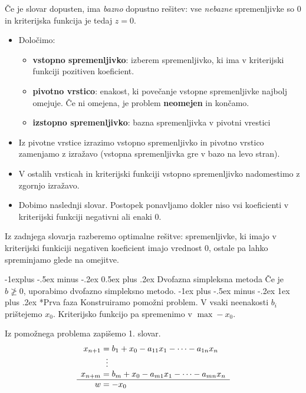 \documentclass[a4paper,8pt]{extarticle}
\makeatletter
\renewcommand{\subsection}{\@startsection{subsection}{2}{0mm}%
                                {-1explus -.5ex minus -.2ex}%
                                {0.5ex plus .2ex}%
                                {\normalfont\normalsize\bfseries}}
\renewcommand{\subsubsection}{\@startsection{subsubsection}{3}{0mm}%
                                {-1ex plus -.5ex minus -.2ex}%
                                {1ex plus .2ex}%
                                {\normalfont\small\bfseries}}
\makeatother
\begin{document}
\begin{multicols}{4}
Če je slovar dopusten, ima \emph{bazno} dopustno rešitev: vse \emph{nebazne} spremenljivke so 0 in kriterijska funkcija je tedaj $z = 0$.
\begin{itemize}
	\item Določimo:
	\begin{itemize}
		\item \textbf{vstopno spremenljivko}: izberem spremenljivko, ki ima v kriterijski funkciji pozitiven koeficient. \\
		\item \textbf{pivotno vrstico}: enakost, ki povečanje vstopne spremenljivke najbolj omejuje. Če ni omejena, je problem \textbf{neomejen} in končamo.\\
		\item \textbf{izstopno spremenljivko}: bazna spremenljivka v pivotni vrestici
	\end{itemize}
	\item Iz pivotne vrstice izrazimo vstopno spremenljivko in pivotno vrstico zamenjamo z izražavo (vstopna spremenljivka gre v bazo na levo stran).
	\item V ostalih vrsticah in kriterijski funkciji vstopno spremenljivko nadomestimo z zgornjo izražavo.
	\item Dobimo naslednji slovar. Postopek ponavljamo dokler niso vsi koeficienti v kriterijski funkciji negativni ali enaki 0.
\end{itemize}

Iz zadnjega slovarja razberemo optimalne rešitve: spremenljivke, ki imajo v kriterijski funkiciji negativen koeficient imajo vrednost 0, ostale pa lahko spreminjamo glede na omejitve.

\subsection{Dvofazna simpleksna metoda}
Če je $b \ngeq 0$, uporabimo dvofazno simpleksno metodo.
\subsubsection*{Prva faza}
Konstruiramo pomožni problem. V vsaki neenakosti $b_i$ prištejemo $x_0$. Kriterijsko funkcijo pa spremenimo v $\max -x_0$.

Iz pomožnega problema zapišemo 1. slovar.
\begin{align*}
	\begin{array}{r@{\;} l}
		x_{n+1} &= b_1  + x_0 - a_{11} x_1 - \dots - a_{1n} x_n \\
		& \ \vdots \\
		x_{n+m} &= b_m + x_0 - a_{m1} x_1 - \dots - a_{mn} x_n \\ \hline
		w &= -x_0
	\end{array}
\end{align*}


\end{multicols}
\end{document}
